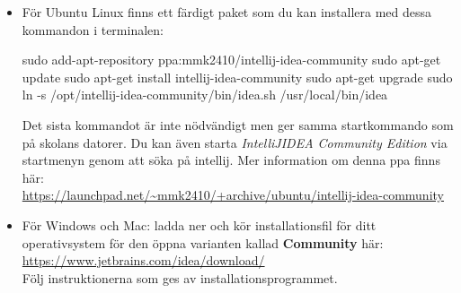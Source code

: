 \begin{itemize}
\item För Ubuntu Linux finns ett färdigt paket som du kan installera med dessa kommandon i terminalen:
\begin{REPLnonum}
sudo add-apt-repository ppa:mmk2410/intellij-idea-community
sudo apt-get update
sudo apt-get install intellij-idea-community
sudo apt-get upgrade
sudo ln -s /opt/intellij-idea-community/bin/idea.sh /usr/local/bin/idea
\end{REPLnonum}
Det sista kommandot är inte nödvändigt men ger samma startkommando som på skolans datorer. Du kan även starta \textit{IntelliJIDEA Community Edition} via startmenyn genom att söka på intellij.
Mer information om denna ppa finns här:\\ \url{https://launchpad.net/~mmk2410/+archive/ubuntu/intellij-idea-community}\item För Windows och Mac: ladda ner och kör installationsfil för ditt operativsystem för den öppna varianten kallad \textbf{Community} här: \\
\url{https://www.jetbrains.com/idea/download/} \\
Följ instruktionerna som ges av installationsprogrammet.
\end{itemize}

